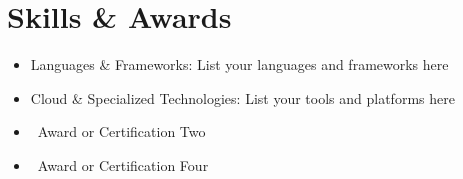 \section{Skills \& Awards}
\begin{itemize}[parsep=0.5ex]
  \item Languages \& Frameworks: List your languages and frameworks here
  \item Cloud \& Specialized Technologies: List your tools and platforms here
  \item {} \textbullet\ Award or Certification Two
  \item {} \textbullet\ Award or Certification Four
\end{itemize}
